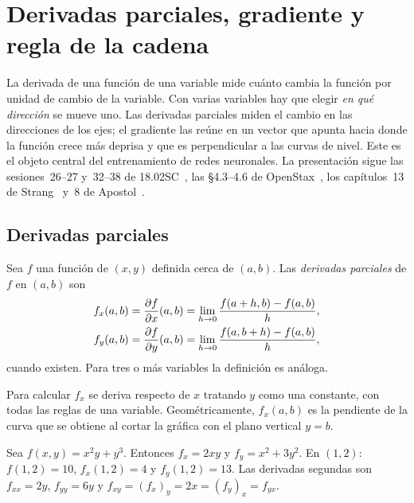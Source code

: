 \chapter{Derivadas parciales, gradiente y regla de la cadena}
\label{tema:4}

La derivada de una función de una variable mide cuánto cambia la función por unidad de cambio de la variable. Con varias variables hay que elegir \emph{en qué dirección} se mueve uno. Las derivadas parciales miden el cambio en las direcciones de los ejes; el gradiente las reúne en un vector que apunta hacia donde la función crece más deprisa y que es perpendicular a las curvas de nivel. Este es el objeto central del entrenamiento de redes neuronales. La presentación sigue las sesiones~26--27 y~32--38 de 18.02SC~\cite{mit1802}, las §4.3--4.6 de OpenStax~\cite{openstax3}, los capítulos~13 de Strang~\cite{strangcalc} y~8 de Apostol~\cite{apostol2}.

\section{Derivadas parciales}

\begin{definicion}\label{def:parcial}
Sea $f$ una función de $(x,y)$ definida cerca de $(a,b)$. Las \emph{derivadas parciales} de $f$ en $(a,b)$ son
\begin{align*}
f_x(a,b)&=\frac{\partial f}{\partial x}(a,b)=\lim_{h\to0}\frac{f(a+h,b)-f(a,b)}{h},\\
f_y(a,b)&=\frac{\partial f}{\partial y}(a,b)=\lim_{h\to0}\frac{f(a,b+h)-f(a,b)}{h},
\end{align*}
cuando existen. Para tres o más variables la definición es análoga.
\end{definicion}

Para calcular $f_x$ se deriva respecto de $x$ tratando $y$ como una constante, con todas las reglas de una variable. Geométricamente, $f_x(a,b)$ es la pendiente de la curva que se obtiene al cortar la gráfica con el plano vertical $y=b$.

\begin{ejemplo}\label{ej:t4-parciales}
Sea $f(x,y)=x^2y+y^3$. Entonces $f_x=2xy$ y $f_y=x^2+3y^2$. En $(1,2)$: $f(1,2)=10$, $f_x(1,2)=4$ y $f_y(1,2)=13$. Las derivadas segundas son $f_{xx}=2y$, $f_{yy}=6y$ y $f_{xy}=(f_x)_y=2x=(f_y)_x=f_{yx}$.
\end{ejemplo}

